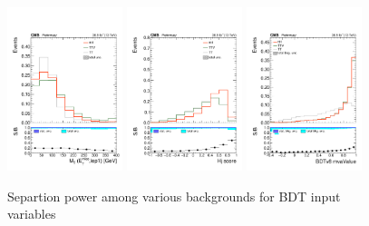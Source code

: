\begin{figure}[htp]
\centering
\includegraphics[width=0.3\textwidth]{ch9_figs/kinMVA_input_MT_met_lep1.pdf}
\includegraphics[width=0.3\textwidth]{ch9_figs/kinMVA_input_BDTv8_eventReco_Hj_score.pdf}
\includegraphics[width=0.3\textwidth]{ch9_figs/kinMVA_input_BDTv8_eventReco_mvaValue.pdf}
\caption[Signal extraction BDT input variables]{Separtion power among various backgrounds for BDT input variables}
\label{fig:inputs2.5}
\end{figure}

